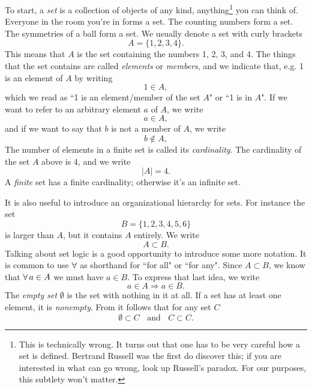 To start, a {\it set} is a collection of objects of
any kind, anything\footnote{This is technically wrong. It turns out that one has
to be very careful how a set is defined. Bertrand Russell was the first do
discover this; if you are interested in what can go wrong, look up 
Russell's
paradox. For our purposes, this subtlety won't matter.}
you can think of. Everyone in the room you're in forms a set. The counting
numbers form a set. The symmetries of a ball form a set. We usually denote a set
with curly brackets
\begin{equation}
A=\{1,2,3,4\}.
\end{equation}
This means that $A$ is the set containing the numbers 1, 2, 3, and 4.
The things that the set contains are called {\it elements}
or {\it members}, and we indicate that, e.g. 1 is an element of
$A$ by writing
\begin{equation}
1\in A,
\end{equation}
which we read as ``1 is an element/member of the set $A$" or ``1 is in $A$".
If we want to refer to an arbitrary element $a$ of $A$, we write
\begin{equation}
a\in A,
\end{equation}
and if we want to say that $b$ is not a member of $A$, we write
\begin{equation}
b\notin A,
\end{equation}
The number of elements in a finite set is called its
{\it cardinality}. The cardinality of the set $A$ above is 4, and we write
\begin{equation}
  |A|=4.
\end{equation}
A {\it finite} set has a finite cardinality; otherwise it's an infinite set.

It is also useful to introduce an organizational hierarchy for sets. For
instance the set
\begin{equation}
  B=\{1,2,3,4,5,6\}
\end{equation}
is larger than $A$, but it contains $A$ entirely. We write
\begin{equation}
A\subset B.
\end{equation}
Talking about set logic is a good opportunity to introduce some more notation.
It is common to use $\operatorname{\forall}$ as shorthand for ``for all" or ``for any".
Since $A\subset B$, we know that $\operatorname{\forall} a\in A$ we must have $a\in B$.
To express that last idea, we write
\begin{equation}\label{eq:subsetIn}
a\in A\Rightarrow a\in B.
\end{equation}
The {\it empty set} $\emptyset$ is the set with nothing in it
at all. If a set has at least one element, it is {\it nonempty}.
From  it follows that for any set $C$
\begin{equation}
\emptyset\subset C~~~~\text{and}~~~~C\subset C.
\end{equation}


